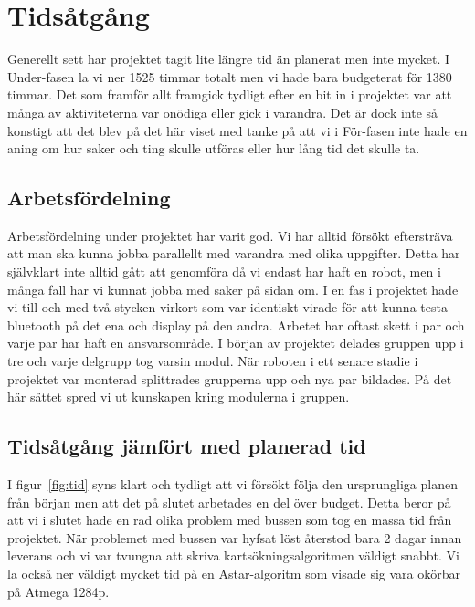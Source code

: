 \documentclass[a4paper,12pt,fleqn]{article}
\begin{document}
\addto\captionsswedish{\renewcommand{\contentsname}{Innehållsförteckning}}

\tableofcontents
\newpage
\pagestyle{fancy}


\section{Tidsåtgång}
Generellt sett har projektet tagit lite längre tid än planerat men inte mycket. I Under-fasen la vi ner 1525 timmar totalt men vi hade bara budgeterat för 1380 timmar. Det som framför allt framgick tydligt efter en bit in i projektet var att många av aktiviteterna var onödiga eller gick i varandra. Det är dock inte så konstigt att det blev på det här viset med tanke på att vi i För-fasen inte hade en aning om hur saker och ting skulle utföras eller hur lång tid det skulle ta. 

\subsection{Arbetsfördelning}
Arbetsfördelning under projektet har varit god. Vi har alltid försökt eftersträva att man ska kunna jobba parallellt med varandra med olika uppgifter. Detta har självklart inte alltid gått att genomföra då vi endast har haft en robot, men i många fall har vi kunnat jobba med saker på sidan om. I en fas i projektet hade vi till och med två stycken virkort som var identiskt virade för att kunna testa bluetooth på det ena och display på den andra. Arbetet har oftast skett i par och varje par har haft en ansvarsområde. I början av projektet delades gruppen upp i tre och varje delgrupp tog varsin modul. När roboten i ett senare stadie i projektet var monterad splittrades grupperna upp och nya par bildades. På det här sättet spred vi ut kunskapen kring modulerna i gruppen. 

\newpage
\subsection{Tidsåtgång jämfört med planerad tid}
I figur~\ref{fig:tid} syns klart och tydligt att vi försökt följa den ursprungliga planen från början men att det på slutet arbetades en del över budget. Detta beror på att vi i slutet hade en rad olika problem med bussen som tog en massa tid från projektet. När problemet med bussen var hyfsat löst återstod bara 2 dagar innan leverans och vi var tvungna att skriva kartsökningsalgoritmen väldigt snabbt. Vi la också ner väldigt mycket tid på en Astar-algoritm som visade sig vara okörbar på Atmega 1284p. 
\end{document}
